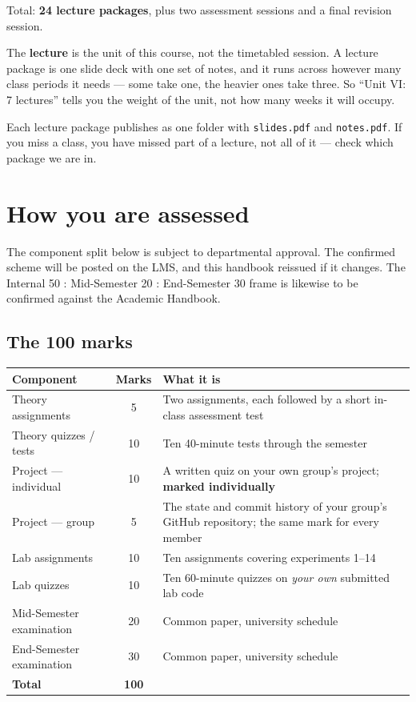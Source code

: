 \documentclass[11pt]{article}
\begin{document}
\noindent Total: \textbf{24 lecture packages}, plus two assessment sessions and
a final revision session.

\begin{keyidea}
The \textbf{lecture} is the unit of this course, not the timetabled session. A
lecture package is one slide deck with one set of notes, and it runs across
however many class periods it needs --- some take one, the heavier ones take
three. So ``Unit VI: 7 lectures'' tells you the weight of the unit, not how many
weeks it will occupy.

Each lecture package publishes as one folder with \texttt{slides.pdf} and
\texttt{notes.pdf}. If you miss a class, you have missed part of a lecture, not
all of it --- check which package we are in.
\end{keyidea}

\newpage
\section{How you are assessed}

\begin{caution}
The component split below is subject to departmental approval. The confirmed
scheme will be posted on the LMS, and this handbook reissued if it changes. The
Internal 50 : Mid-Semester 20 : End-Semester 30 frame is likewise to be confirmed
against the Academic Handbook.
\end{caution}

\subsection{The 100 marks}

\begin{center}
\begin{tabular}{@{}p{6.2cm}cp{6.4cm}@{}}
\toprule
\textbf{Component} & \textbf{Marks} & \textbf{What it is}\\
\midrule
Theory assignments & 5 & Two assignments, each followed by a short in-class assessment test\\
Theory quizzes / tests & 10 & Ten 40-minute tests through the semester\\
Project --- individual & 10 & A written quiz on your own group's project; \textbf{marked individually}\\
Project --- group & 5 & The state and commit history of your group's GitHub repository; the same mark for every member\\
Lab assignments & 10 & Ten assignments covering experiments 1--14\\
Lab quizzes & 10 & Ten 60-minute quizzes on \emph{your own} submitted lab code\\
Mid-Semester examination & 20 & Common paper, university schedule\\
End-Semester examination & 30 & Common paper, university schedule\\
\midrule
\textbf{Total} & \textbf{100} & \\
\bottomrule
\end{tabular}
\end{center}
\end{document}
